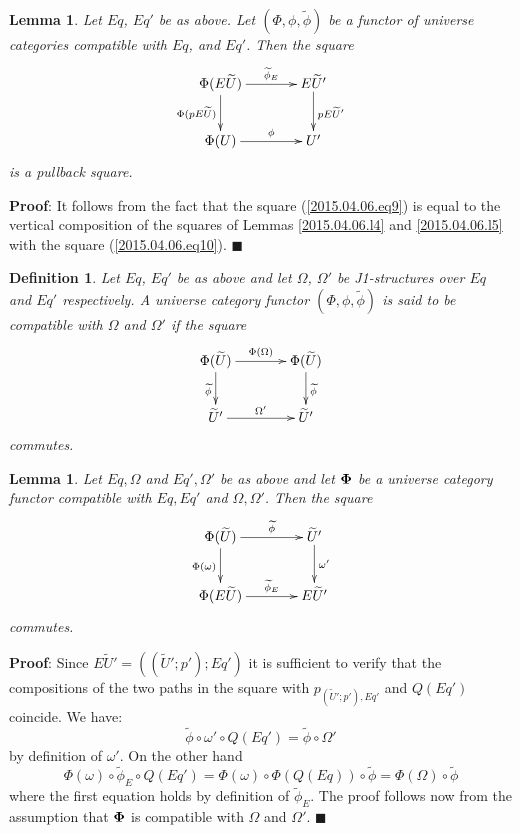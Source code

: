 \documentclass[12pt]{article}
\numberwithin{equation}{section}
\newenvironment{eq}{\begin{equation}}{\end{equation}}
\newenvironment{myproof}{{\bf Proof}:}{$\blacksquare$ \vskip 5mm }
\newtheorem{lemma}[proposition]{Lemma}
\newtheorem{definition}[proposition]{Definition}
\newcommand{\llabel}[1]{\label{#1}}
\newcommand{\wt}{\widetilde}
\begin{document}
%
\begin{lemma}
\llabel{2015.04.06.l6} Let $Eq$, $Eq'$ be as above. Let $(\Phi,\phi,\wt{\phi})$
be a functor of universe categories compatible with $Eq$, and $Eq'$. Then the
square
%
\begin{eq}\llabel{2015.04.06.eq9}
\begin{xy}
          \xymatrix@C=3pc{ \Phi(E\wt{U}) \ar[r]^-{\wt{\phi}_{E}}
            \ar[d]_{\Phi(pE\wt{U})} & E\wt{U}' \ar[d]^{pE\wt{U}'}\\ \Phi(U)
            \ar[r]^-{\phi} & U' }
\end{xy}
\end{eq}
%
is a pullback square.
%
\end{lemma} 
%
\begin{myproof}
It follows from the fact that the square (\ref{2015.04.06.eq9}) is equal to the
vertical composition of the squares of Lemmas \ref{2015.04.06.l4} and
\ref{2015.04.06.l5} with the square (\ref{2015.04.06.eq10}).
\end{myproof}
%


\begin{definition}
\llabel{2015.04.06.def5} Let $Eq$, $Eq'$ be as above and let $\Omega$,
$\Omega'$ be J1-structures over $Eq$ and $Eq'$ respectively. A universe
category functor $(\Phi,\phi,\wt{\phi})$ is said to be compatible with $\Omega$
and $\Omega'$ if the square
%
$$
\begin{xy}
          \xymatrix@C=3pc{ \Phi(\wt{U}) \ar[r]^-{\Phi(\Omega)}
            \ar[d]_{\wt{\phi}} & \Phi(\wt{U})\ar[d]^{\wt{\phi}}\\ \wt{U}'
            \ar[r]^-{\Omega'} & \wt{U}' }
\end{xy}
$$
%
commutes.
\end{definition}
%
\begin{lemma}
\llabel{2015.04.10.l7} Let $Eq,\Omega$ and $Eq',\Omega'$ be as above and let
${\bf\Phi}$ be a universe category functor compatible with $Eq,Eq'$ and
$\Omega,\Omega'$. Then the square
%
$$
\begin{xy}
          \xymatrix@C=3pc{ \Phi(\wt{U}) \ar[r]^-{\wt{\phi}}
            \ar[d]_{\Phi(\omega)} & \wt{U}'\ar[d]^-{\omega'}\\ \Phi(E\wt{U})
            \ar[r]^-{\wt{\phi}_{E}} & E\wt{U}' }
\end{xy}
$$
%
commutes.
\end{lemma}
%
\begin{myproof}
Since $E\wt{U}'=((\wt{U}';p');Eq')$ it is sufficient to verify that the
compositions of the two paths in the square with $p_{(\wt{U}';p'),Eq'}$ and
$Q(Eq')$ coincide. We have:
%
$$\wt{\phi}\circ\omega'\circ Q(Eq')=\wt{\phi}\circ\Omega'$$
%
by definition of $\omega'$. On the other hand
%
$$\Phi(\omega)\circ \wt{\phi}_{E}\circ Q(Eq')=\Phi(\omega)\circ
\Phi(Q(Eq))\circ \wt{\phi}=\Phi(\Omega)\circ\wt{\phi}$$
%
where the first equation holds by definition of $\wt{\phi}_{E}$. The proof
follows now from the assumption that ${\bf\Phi}$ is compatible with $\Omega$
and $\Omega'$.
\end{myproof}
%
\end{document}
